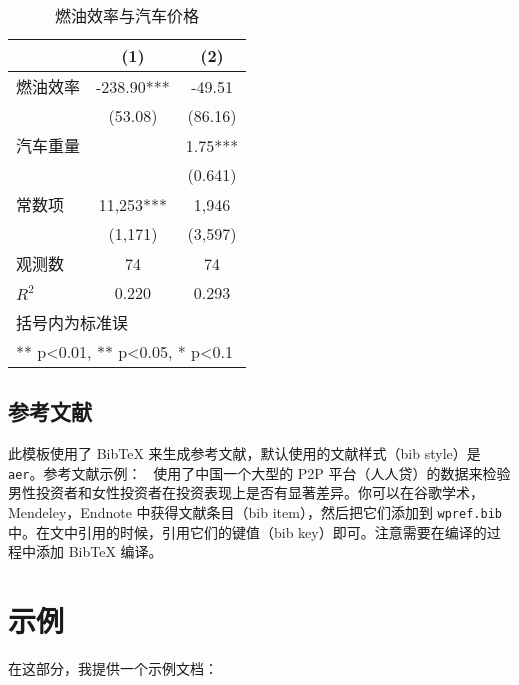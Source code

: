 \documentclass[lang=cn]{elegantpaper}
\begin{document}
\begin{table}[htbp]
  \small
  \centering
  \caption{燃油效率与汽车价格}
    \begin{tabular}{lcc}
    \toprule
                    &       (1)         &        (2)      \\
    \midrule
    燃油效率        &    -238.90***     &      -49.51     \\
                    &     (53.08)       &      (86.16)    \\
    汽车重量        &                   &        1.75***  \\
                    &                   &       (0.641)   \\
    常数项          &  11,253***        &    1,946       \\
                    &  (1,171)          &   (3,597)      \\
    观测数          &      74           &       74        \\
    $R^2$           &       0.220       &        0.293    \\
    \bottomrule
    \multicolumn{3}{l}{\scriptsize 括号内为标准误} \\
    \multicolumn{3}{l}{\scriptsize *** p<0.01, ** p<0.05, * p<0.1} \\
    \end{tabular}%
  \label{tab:reg}%
\end{table}%


\subsection{参考文献}
此模板使用了 Bib\TeX{} 来生成参考文献，默认使用的文献样式（bib style）是 \lstinline{aer}。参考文献示例：~\cite{Chen2018} 使用了中国一个大型的 P2P 平台（人人贷）的数据来检验男性投资者和女性投资者在投资表现上是否有显著差异。你可以在谷歌学术，Mendeley，Endnote 中获得文献条目（bib item），然后把它们添加到 \lstinline{wpref.bib} 中。在文中引用的时候，引用它们的键值（bib key）即可。注意需要在编译的过程中添加 Bib\TeX{} 编译。


\section{示例}
在这部分，我提供一个示例文档：
\end{document}
